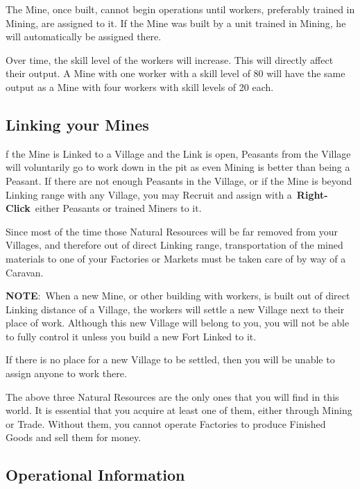 The Mine, once built, cannot begin operations until workers, preferably trained in Mining, are assigned to it. If the Mine was built by a unit trained in Mining, he will automatically be assigned there.

Over time, the skill level of the workers will increase. This will directly affect their output. A Mine with one worker with a skill level of 80 will have the same output as a Mine with four workers with skill levels of 20 each.

\subsection{Linking your Mines}


f the Mine is Linked to a Village and the Link is open, Peasants from the Village will voluntarily go to work down in the pit as even Mining is better than being a Peasant. If there are not enough Peasants in the Village, or if the Mine is beyond Linking range with any Village, you may Recruit and assign with a \textbf{Right-Click} either Peasants or trained Miners to it.

Since most of the time those Natural Resources will be far removed from your Villages, and therefore out of direct Linking range, transportation of the mined materials to one of your Factories or Markets must be taken care of by way of a Caravan.

\textbf{NOTE}: When a new Mine, or other building with workers, is built out of direct Linking distance of a Village, the workers will settle a new Village next to their place of work. Although this new Village will belong to you, you will not be able to fully control it unless you build a new Fort Linked to it.

If there is no place for a new Village to be settled, then you will be unable to assign anyone to work there.

The above three Natural Resources are the only ones that you will find in this world. It is essential that you acquire at least one of them, either through Mining or Trade. Without them, you cannot operate Factories to produce Finished Goods and sell them for money.

\subsection{Operational Information}

